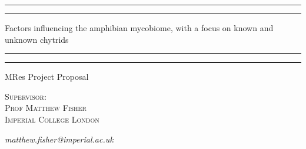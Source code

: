 \documentclass[11pt, a4paper, titlepage]{article}
\begin{document}
\nolinenumbers
\begin{titlepage} %
	
	\centering %
	
	\scshape %
	
	\vspace*{\baselineskip} %
	
	
	
	
	\rule{\textwidth}{1.6pt}\vspace*{-\baselineskip}\vspace*{2pt} %
	
	\rule{\textwidth}{0.4pt} %
	
	\vspace{0.75\baselineskip} %
	
	{\LARGE Factors influencing the amphibian mycobiome, with a focus on known and unknown chytrids \\} %
	
	\vspace{0.75\baselineskip} %

	\rule{\textwidth}{0.4pt}\vspace*{-\baselineskip}\vspace{3.2pt} %
	
	\rule{\textwidth}{1.6pt} %
	
	\vspace{2\baselineskip} %
	
	
	
	
	MRes Project Proposal %
	
	\vspace*{3\baselineskip} %
	
	
	
	
	\vspace{0.5\baselineskip} %
	
	{\scshape\Large Supervisor:\\
		Prof Matthew Fisher \\
		Imperial College London\\} %
	
	\textit{matthew.fisher@imperial.ac.uk}

\end{titlepage}
\end{document}
